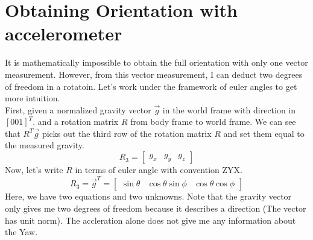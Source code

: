 \documentclass[english]{article}
\newcommand{\grav}{\overrightarrow{g}}
\begin{document}
\section*{Obtaining Orientation with accelerometer}
It is mathematically impossible to obtain the full orientation with only one vector measurement. However, from this vector measurement, I can deduct two degrees of freedom in a rotatoin. Let's work under the framework of euler angles to get more intuition.\\
First, given a normalized gravity vector $\grav$ in the world frame with direction in $[0 0 1]^T$. and a rotation matrix $R$ from body frame to world frame. We can see that $R^T\grav$ picks out the third row of the rotation matrix $R$ and set them equal to the measured gravity.
\[
R_3 = \begin{bmatrix} g_x & g_y & g_z \end{bmatrix}
\]
Now, let's write $R$ in terms of euler angle with convention ZYX. 
\[R_3 = \grav^T = \begin{bmatrix}
\sin{\theta} & \cos{\theta}\sin{\phi} & \cos{\theta}\cos{\phi}
\end{bmatrix} \]
Here, we have two equations and two unknowns. Note that the gravity vector only gives me two degrees of freedom because it describes a direction (The vector has unit norm). The accleration alone does not give me any information about the Yaw.\\\\
\end{document}
